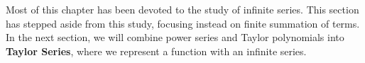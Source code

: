 %

\bigskip

Most of this chapter has been devoted to the study of infinite series. This section has stepped aside from this study, focusing instead on finite summation of terms. In the next section, we will combine power series and Taylor polynomials into \textbf{Taylor Series}, where we represent a function with an infinite series.



